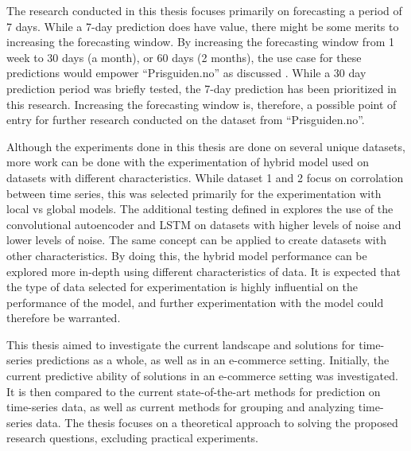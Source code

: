 The research conducted in this thesis focuses primarily on forecasting a period of 7 days.
While a 7-day prediction does have value,
there might be some merits to increasing the forecasting window.
By increasing the forecasting window from 1 week to 30 days (a month), or 60 days (2 months),
the use case for these predictions would empower ``Prisguiden.no'' as discussed .
While a 30 day prediction period was briefly tested,
the 7-day prediction has been prioritized in this research.
Increasing the forecasting window is, therefore, a possible point of entry for further research conducted on the
dataset from ``Prisguiden.no''.


Although the experiments done in this thesis are done on several unique datasets,
more work can be done with the experimentation of hybrid model used on datasets with different characteristics.
While dataset 1 and 2 focus on corrolation between time series, this was selected primarily for the experimentation with local vs global models.
The additional testing defined in  explores the use of the convolutional autoencoder and LSTM
on datasets with higher levels of noise and lower levels of noise.
The same concept can be applied to create datasets with other characteristics.
By doing this, the hybrid model performance can be explored more in-depth using different characteristics of data.
It is expected that the type of data selected for experimentation is highly influential on the performance of the model,
and further experimentation with the model could therefore be warranted.




\iffalse
  This thesis aimed to investigate the current landscape and solutions for time-series predictions as a whole,
  as well as in an e-commerce setting.
  Initially, the current predictive ability of solutions in an e-commerce setting was investigated.
  It is then compared to the current state-of-the-art methods for prediction on time-series data,
  as well as current methods for grouping and analyzing time-series data.
  The thesis focuses on a theoretical approach to solving the proposed research questions,
  excluding practical experiments.


